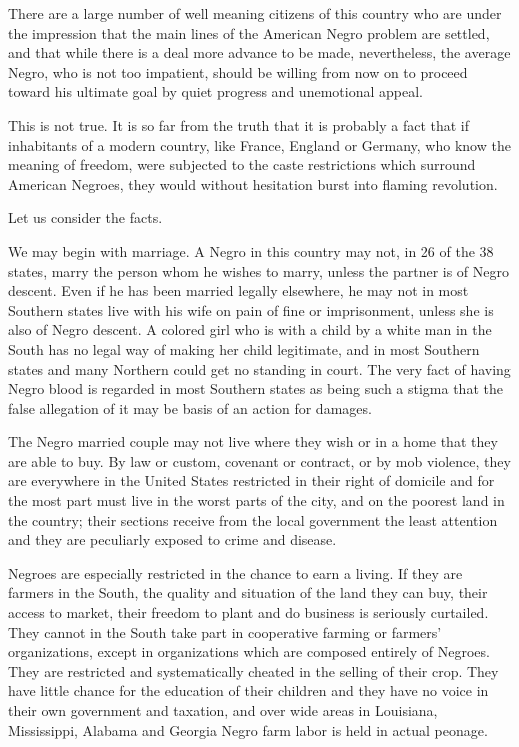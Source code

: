 \documentclass[letterpaper,10pt,english]{jupyterBook}
\begin{document}
\sphinxAtStartPar
There are a large number of well meaning citizens of this country who are under the impression that the main lines of the American Negro problem are settled, and that while there is a deal more advance to be made, nevertheless, the average Negro, who is not too impatient, should be willing from now on to proceed toward his ultimate goal by quiet progress and unemotional appeal.

\sphinxAtStartPar
This is not true. It is so far from the truth that it is probably a fact that if inhabitants of a modern country, like France, England or Germany, who know the meaning of freedom, were subjected to the caste restrictions which surround American Negroes, they would without hesitation burst into flaming revolution.

\sphinxAtStartPar
Let us consider the facts.

\sphinxAtStartPar
We may begin with marriage. A Negro in this country may not, in 26 of the 38 states, marry the person whom he wishes to marry, unless the partner is of Negro descent. Even if he has been married legally elsewhere, he may not in most Southern states live with his wife on pain of fine or imprisonment, unless she is also of Negro descent. A colored girl who is with a child by a white man in the South has no legal way of making her child legitimate, and in most Southern states and many Northern could get no standing in court. The very fact of having Negro blood is regarded in most Southern states as being such a stigma that the false allegation of it may be basis of an action for damages.

\sphinxAtStartPar
The Negro married couple may not live where they wish or in a home that they are able to buy. By law or custom, covenant or contract, or by mob violence, they are everywhere in the United States restricted in their right of domicile and for the most part must live in the worst parts of the city, and on the poorest land in the country; their sections receive from the local government the least attention and they are peculiarly exposed to crime and disease.

\sphinxAtStartPar
Negroes are especially restricted in the chance to earn a living. If they are farmers in the South, the quality and situation of the land they can buy, their access to market, their freedom to plant and do business is seriously curtailed. They cannot in the South take part in co\sphinxhyphen{}operative farming or farmers’ organizations, except in organizations which are composed entirely of Negroes. They are restricted and systematically cheated in the selling of their crop. They have little chance for the education of their children and they have no voice in their own government and taxation, and over wide areas in Louisiana, Mississippi, Alabama and Georgia Negro farm labor is held in actual peonage.
\end{document}

